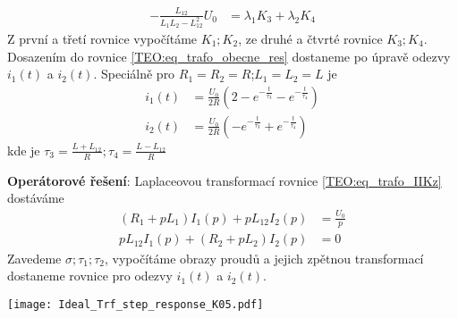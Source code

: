 \begin{example}
\begin{subequations}
\begin{align}
   -\frac{L_{12}}{L_1L_2-L_{12}^2}U_0 &= \lambda_1K_3 + \lambda_2K_4
    \end{align}
  \end{subequations}
  Z první a třetí rovnice vypočítáme $K_1; K_2$, ze druhé a čtvrté rovnice $K_3; K_4$.
  Do\-sa\-ze\-ním do rovnice \ref{TEO:eq_trafo_obecne_res} dostaneme po úpravě odezvy $i_1(t)$
  a $i_2(t)$. Speciálně pro $R_1=R_2=R$;$L_1=L_2=L$ je
  \begin{subequations}\label{TEO:eq_trafo_solved_RL}
    \begin{align}
      i_1(t) &= \frac{U_0}{2R}\left(2-e^{-\frac{t}{\tau_3}}-e^{-\frac{t}{\tau_4}}\right) \\
      i_2(t) &= \frac{U_0}{2R}\left(-e^{-\frac{t}{\tau_3}}+e^{-\frac{t}{\tau_4}}\right)
    \end{align}
  \end{subequations}
  kde je $\tau_3 = \frac{L + L_{12}}{R}; \tau_4 = \frac{L - L_{12}}{R}$
  
  \textbf{Operátorové řešení}: Laplaceovou transformací rovnice \ref{TEO:eq_trafo_IIKz}
  dostáváme
  \begin{subequations}\label{TEO:eq_trafo_laplace}
    \begin{align}
      (R_1 + pL_1)I_1(p)+pL_{12}I_2(p)   &= \frac{U_0}{p} \\
      pL_{12}I_1(p) + (R_2 + pL_2)I_2(p) &= 0
    \end{align}
  \end{subequations}
  Zavedeme $\sigma; \tau_1; \tau_2$, vypočítáme obrazy proudů a jejich zpětnou transformací
  do\-sta\-ne\-me rovnice pro odezvy $i_1(t)$ a $i_2(t)$.
  
  {\centering
   \captionsetup{type=figure}
   \texttt{[image: Ideal\_Trf\_step\_response\_K05.pdf]}
  \label{figure:trafo_int_uprim}
  \par}
\end{example}

